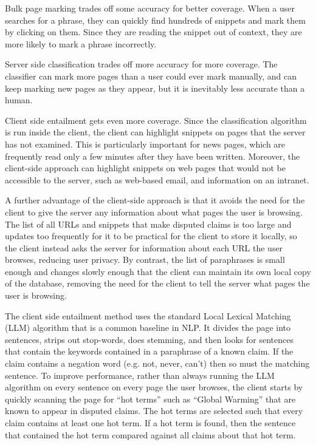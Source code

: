 \documentclass{www2010-submission}
\begin{document}
Bulk page marking trades off some accuracy for better coverage. When a user searches for a phrase, they can quickly find hundreds of snippets and mark them by clicking on them. Since they are reading the snippet out of context, they are more likely to mark a phrase incorrectly. 

Server side classification trades off more accuracy for more coverage. The classifier can mark more pages than a user could ever mark manually, and can keep marking new pages as they appear, but it is inevitably less accurate than a human.

Client side entailment gets even more coverage. Since the classification algorithm is run inside the client, the client can highlight snippets on pages that the server has not examined. This is particularly important for news pages, which are frequently read only a few minutes after they have been written. Moreover, the client-side approach can highlight snippets on web pages that would not be accessible to the server, such as web-based email, and information on an intranet. 

A further advantage of the client-side approach is that it avoids the need for the client to give the server any information about what pages the user is browsing. The list of all URLs and snippets that make disputed claims is too large and updates too frequently for it to be practical for the client to store it locally, so the client instead asks the server for information about each URL the user browses, reducing user privacy. By contrast, the list of paraphrases is small enough and changes slowly enough that the client can maintain its own local copy of the database, removing the need for the client to tell the server what pages the user is browsing.

The client side entailment method uses the standard Local Lexical Matching (LLM) algorithm that is a common baseline in NLP. It divides the page into sentences, strips out stop-words, does stemming, and then looks for sentences that contain the keywords contained in a paraphrase of a known claim. If the claim contains a negation word (e.g. not, never, can't) then so must the matching sentence. To improve performance, rather than always running the LLM algorithm on every sentence on every page the user browses, the client starts by quickly scanning the page for ``hot terms'' such as ``Global Warming'' that are known to appear in disputed claims. The hot terms are selected such that every claim contains at least one hot term. If a hot term is found, then the sentence that contained the hot term compared against all claims about that hot term.
\end{document}
